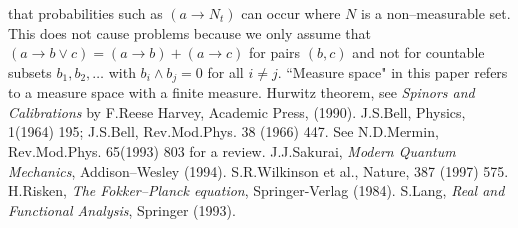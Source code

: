 \documentclass[11pt]{article}
\begin{document}
\begin{thebibliography}{10}
that probabilities such as $(a\rightarrow N_t)$ can occur where $N$ is a non--measurable
set.  This does not cause problems because we only assume that 
$(a\rightarrow b\vee c)=(a\rightarrow b)+(a\rightarrow c)$ for pairs $(b,c)$ and not
for countable subsets $b_1,b_2,\dots$ with $b_i\wedge b_j=0$ for all $i\neq j$.  ``Measure
space" in this paper refers to a measure space with a finite measure.
 Hurwitz theorem, see {\it Spinors and Calibrations} by F.Reese Harvey, Academic Press, 
(1990).
 J.S.Bell, Physics, 1(1964) 195; J.S.Bell, Rev.Mod.Phys. 38 (1966) 447.  See
N.D.Mermin, Rev.Mod.Phys. 65(1993) 803 for a review.
 J.J.Sakurai, {\it Modern Quantum Mechanics}, Addison--Wesley (1994).
 S.R.Wilkinson et al., Nature, 387 (1997) 575.
 H.Risken, {\it The Fokker--Planck equation}, Springer-Verlag (1984).
 S.Lang, {\it Real and Functional Analysis}, Springer (1993).

\end{thebibliography}
\end{document}
